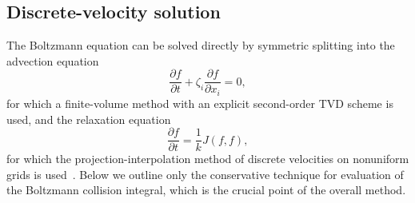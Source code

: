 \documentclass[]{jfm}
\newcommand{\pder}[2][]{\frac{\partial#1}{\partial#2}}
\begin{document}
\subsection{Discrete-velocity solution}

The Boltzmann equation can be solved directly by symmetric splitting
into the advection equation
\begin{equation}\label{eq:split_advection}
    \pder[f]{t} + \zeta_i\pder[f]{x_i} = 0,
\end{equation}
for which a finite-volume method with an explicit second-order TVD scheme is used,
and the relaxation equation
\begin{equation}\label{eq:split_integral}
    \pder[f]{t} = \frac1k J(f,f),
\end{equation}
for which the projection-interpolation method of discrete velocities
on nonuniform grids is used~\citep{Dodulad2015}.
Below we outline only the conservative technique for evaluation
of the Boltzmann collision integral, which is the crucial point of the overall method.
\end{document}
